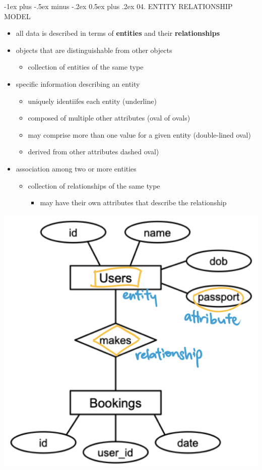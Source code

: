 \documentclass[10pt, landscape]{article}
\makeatletter
\renewcommand{\section}{\@startsection{section}{1}{0mm}%
  {-1ex plus -.5ex minus -.2ex}%
  {0.5ex plus .2ex}%
{\normalfont\large\bfseries}}
\makeatother
\begin{document}
\begin{multicols}{3}
  \section{04. ENTITY RELATIONSHIP MODEL}
  \begin{itemize}
    \item all data is described in terms of \textbf{entities} and their \textbf{relationships}
    \item {} objects that are distinguishable from other objects
      \begin{itemize}
        \item {} collection of entities of the same type
      \end{itemize}
    \item {} specific information describing an entity
      \begin{itemize}
        \item {} uniquely identiifes each entity (underline)
        \item {} composed of multiple other attributes (oval of ovals)
        \item {} may comprise more than one value for a given entity (double-lined oval)
        \item {} derived from other attributes dashed oval)
      \end{itemize}
    \item {} association among two or more entities
      \begin{itemize}
        \item {} collection of relationships of the same type
          \begin{itemize}
            \item may have their own attributes that describe the relationship
          \end{itemize}
      \end{itemize}
  \end{itemize}
  \includegraphics[width=0.4\linewidth]{cs2102-entity-relationship-model.png} 

\end{multicols}
\end{document}
